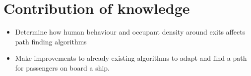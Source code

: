 \chapter{Contribution of knowledge}
\label{ch:contribution}



\begin{itemize}
  \item Determine how human behaviour and occupant density around exits affects path finding algorithms
  \item Make improvements to already existing algorithms to adapt and find a path for passengers on board a ship.
\end{itemize}